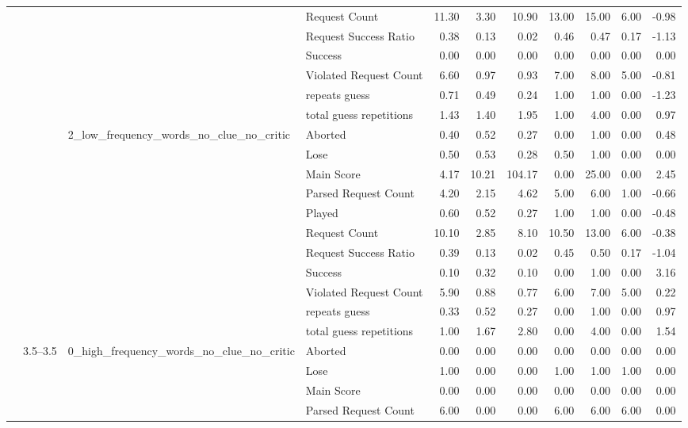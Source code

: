 \begin{tabular}{llllrrrrrrr}
 &  &  & Request Count & 11.30 & 3.30 & 10.90 & 13.00 & 15.00 & 6.00 & -0.98 \\
 &  &  & Request Success Ratio & 0.38 & 0.13 & 0.02 & 0.46 & 0.47 & 0.17 & -1.13 \\
 &  &  & Success & 0.00 & 0.00 & 0.00 & 0.00 & 0.00 & 0.00 & 0.00 \\
 &  &  & Violated Request Count & 6.60 & 0.97 & 0.93 & 7.00 & 8.00 & 5.00 & -0.81 \\
 &  &  & repeats guess & 0.71 & 0.49 & 0.24 & 1.00 & 1.00 & 0.00 & -1.23 \\
 &  &  & total guess repetitions & 1.43 & 1.40 & 1.95 & 1.00 & 4.00 & 0.00 & 0.97 \\
\cline{3-11}
 &  & \multirow[t]{11}{*}{2_low_frequency_words_no_clue_no_critic} & Aborted & 0.40 & 0.52 & 0.27 & 0.00 & 1.00 & 0.00 & 0.48 \\
 &  &  & Lose & 0.50 & 0.53 & 0.28 & 0.50 & 1.00 & 0.00 & 0.00 \\
 &  &  & Main Score & 4.17 & 10.21 & 104.17 & 0.00 & 25.00 & 0.00 & 2.45 \\
 &  &  & Parsed Request Count & 4.20 & 2.15 & 4.62 & 5.00 & 6.00 & 1.00 & -0.66 \\
 &  &  & Played & 0.60 & 0.52 & 0.27 & 1.00 & 1.00 & 0.00 & -0.48 \\
 &  &  & Request Count & 10.10 & 2.85 & 8.10 & 10.50 & 13.00 & 6.00 & -0.38 \\
 &  &  & Request Success Ratio & 0.39 & 0.13 & 0.02 & 0.45 & 0.50 & 0.17 & -1.04 \\
 &  &  & Success & 0.10 & 0.32 & 0.10 & 0.00 & 1.00 & 0.00 & 3.16 \\
 &  &  & Violated Request Count & 5.90 & 0.88 & 0.77 & 6.00 & 7.00 & 5.00 & 0.22 \\
 &  &  & repeats guess & 0.33 & 0.52 & 0.27 & 0.00 & 1.00 & 0.00 & 0.97 \\
 &  &  & total guess repetitions & 1.00 & 1.67 & 2.80 & 0.00 & 4.00 & 0.00 & 1.54 \\
\cline{2-11} \cline{3-11}
 & \multirow[t]{33}{*}{3.5--3.5} & \multirow[t]{11}{*}{0_high_frequency_words_no_clue_no_critic} & Aborted & 0.00 & 0.00 & 0.00 & 0.00 & 0.00 & 0.00 & 0.00 \\
 &  &  & Lose & 1.00 & 0.00 & 0.00 & 1.00 & 1.00 & 1.00 & 0.00 \\
 &  &  & Main Score & 0.00 & 0.00 & 0.00 & 0.00 & 0.00 & 0.00 & 0.00 \\
 &  &  & Parsed Request Count & 6.00 & 0.00 & 0.00 & 6.00 & 6.00 & 6.00 & 0.00 \\

\end{tabular}
